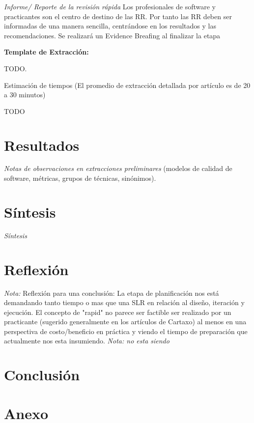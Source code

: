\documentclass[conference]{IEEEtran}
\begin{document}
\textit{ Informe/ Reporte de la  revisión rápida}
 Los profesionales de software y practicantes son el centro de  destino de las RR. Por tanto las RR deben ser informadas de una manera sencilla, centrándose en los resultados y las recomendaciones. Se realizará un Evidence Breafing \cite{cartaxo2016evidence} al finalizar la etapa

\textbf{Template de Extracción: }

TODO.

Estimación de tiempos (El promedio de extracción detallada por artículo es de 20 a 30 minutos) 

TODO 

\section{Resultados}
\textit{Notas de observaciones en  extracciones preliminares}
(modelos de calidad de software, métricas, grupos de técnicas,
sinónimos).


\section{Síntesis}
\textit {Síntesis}


\section{Reflexión}
\textit{Nota: } Reflexión para una conclusión: La etapa de planificación nos está demandando tanto tiempo o mas que una SLR en relación al diseño, iteración y ejecución. El concepto de "rapid"  no parece ser factible ser realizado por un practicante (sugerido generalmente en los artículos de Cartaxo) al menos en una perspectiva de costo/beneficio en práctica y viendo el tiempo de preparación que actualmente nos esta insumiendo. 
\textit{Nota: no esta siendo }
\section{Conclusión}



\section*{Anexo}
\end{document}

